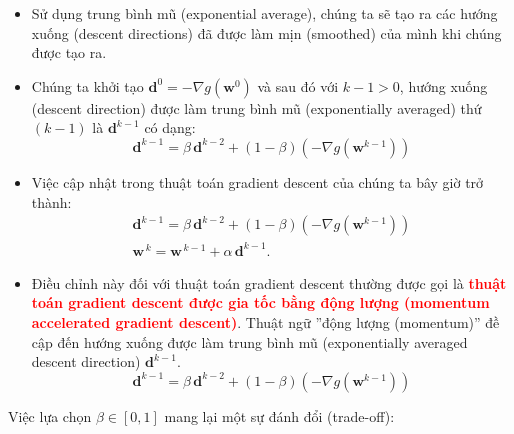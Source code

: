 \documentclass{book}
\begin{document}
\begin{itemize}
    \item Sử dụng trung bình mũ (exponential average), chúng ta sẽ tạo ra các hướng xuống (descent directions) đã được làm mịn (smoothed) của mình khi chúng được tạo ra.
    \item Chúng ta khởi tạo $\mathbf{d}^0 = -\nabla g\left(\mathbf{w}^0\right)$ và sau đó với $k -1 > 0$, hướng xuống (descent direction) được làm trung bình mũ (exponentially averaged) thứ $\left(k-1\right)$ là $\mathbf{d}^{k-1}$ có dạng:
        \begin{equation*}
            \mathbf{d}^{k-1} = \beta \, \mathbf{d}^{k-2} +  \left(1 - \beta\right)\left(-\nabla g\left(\mathbf{w}^{k-1}\right)\right)
        \end{equation*}
    \item Việc cập nhật trong thuật toán gradient descent của chúng ta bây giờ trở thành:
        \begin{equation*}
            \begin{aligned}
            \mathbf{d}^{k-1} = \beta \, \mathbf{d}^{k-2}  + \left(1 - \beta\right)\left(-\nabla g\left(\mathbf{w}^{k-1}\right)\right) \\
            \mathbf{w}^{\,k} = \mathbf{w}^{\,k-1} + \alpha \, \mathbf{d}^{k-1}. \,\,\,\,\,\,\,\,\,\,\,\,\,     \,\,\,\,\,\,\,\,\,\,\,\,\,      \,\,\,
            \end{aligned}
        \end{equation*}
    \item Điều chỉnh này đối với thuật toán gradient descent thường được gọi là \textbf{\textcolor{red}{thuật toán gradient descent được gia tốc bằng động lượng (momentum accelerated gradient descent)}}. Thuật ngữ ''động lượng (momentum)'' đề cập đến hướng xuống được làm trung bình mũ (exponentially averaged descent direction) $\mathbf{d}^{k-1}$.
        \begin{equation*}
            \mathbf{d}^{k-1} = \beta \, \mathbf{d}^{k-2} +  \left(1 - \beta\right)\left(-\nabla g\left(\mathbf{w}^{k-1}\right)\right)
        \end{equation*}
\end{itemize}
Việc lựa chọn $\beta \in \left[0,1\right]$ mang lại một sự đánh đổi (trade-off):
\end{document}
